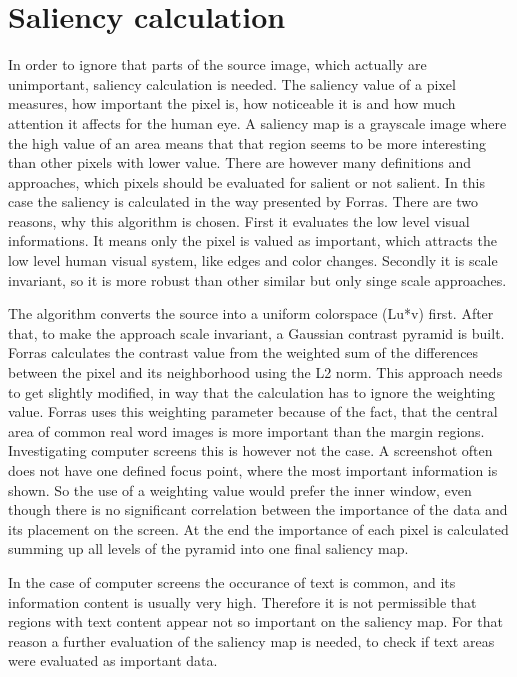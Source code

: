 \documentclass[draft,final]{vutinfth} %
\begin{document}
\section{Saliency calculation}
In order to ignore that parts of the source image, which actually are unimportant, saliency calculation is needed.
The saliency value of a pixel measures, how important the pixel is, how noticeable it is and how much attention it affects for the human eye.
A saliency map is a grayscale image where the high value of an area means that that region seems to be more interesting than other pixels with lower value.
There are however many definitions and approaches, which pixels should be evaluated for salient or not salient.
In this case the saliency is calculated in the way presented by Forras. 
There are two reasons, why this algorithm is chosen.
First it evaluates the low level visual informations.
It means only the pixel is valued as important, which attracts the low level human visual system, like edges and color changes.
Secondly it is scale invariant, so it is more robust than other similar but only singe scale approaches.\par 
The algorithm converts the source into a uniform colorspace (Lu*v) first.
After that, to make the approach scale invariant, a Gaussian contrast pyramid is built.
Forras calculates the contrast value from the weighted sum of  the  differences between the pixel and its neighborhood using the L2 norm.
This approach needs to get slightly modified, in way that the calculation has to ignore the weighting value.
Forras uses this weighting parameter because of the fact, that the central area of common real word images is more important than the margin regions.
Investigating computer screens this is however not the case.
A screenshot often does not have one defined focus point, where the most important information is shown.
So the use of a weighting value would prefer the inner window, even though there is no significant correlation between the importance of the data and its placement on the screen.
At the end the importance of each pixel is calculated summing up all levels of the pyramid into one final saliency map.\par
In the case of computer screens the occurance of text is common, and its information content is usually very high.
Therefore it is not permissible that regions with text content appear not so important on the saliency map.
For that reason a further evaluation of the saliency map is needed, to check if text areas were evaluated as important data.\par 
\end{document}
